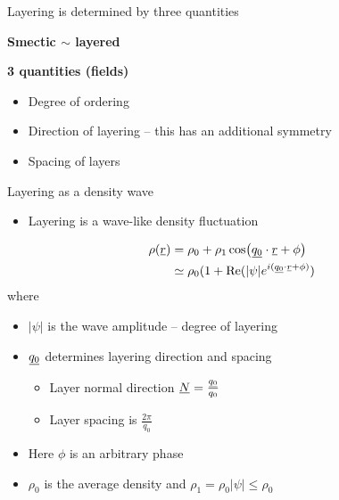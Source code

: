 \documentclass[10pt,mathserif]{beamer}
\newcommand{\suf}[2]{\stackunder[0.5pt]{\stackunder[1pt]{\ensuremath{#1}}{\rule{\widthof{\ensuremath{#2}}*\real{0.9}}{.1ex}}}{}}
\newcommand{\su}[1]{\suf{#1}{#1}}
\newcommand{\ssu}[1]{\scriptsize\su{#1}\normalsize}
\newcommand{\NN}{\ensuremath{\su{N}}}
\newcommand{\extra}[1]{\color{gray} #1 \normalcolor}
\newcommand{\subheading}[1]{\large\textbf{#1}\normalsize}
\begin{document}
\begin{frame}[fragile]{Layering is determined by three quantities}
    \newrefsection
    \vspace{-\fill}
    \vspace{3em}
    \begin{center}
        \subheading{Smectic $\sim$ layered}
        \vspace{3em}

        \subheading{3 quantities \extra{(fields)}}
    \end{center}
    \begin{itemize}
        \item Degree of ordering
        \item Direction of layering \extra{-- this has an additional symmetry}
        \item Spacing of layers
    \end{itemize}
\end{frame}

\begin{frame}[fragile]{Layering as a density wave}
    \newrefsection
    \begin{itemize}
        \item Layering is a wave-like density fluctuation
    \end{itemize}
    \vspace{-1em}
    \begin{align*}
        \rho(\su{r}) &= \rho_0 + \rho_1\cos(\su{q_0}\cdot\su{r} + \phi) \\
        &\simeq \rho_0 (1 + \Re(|\psi| e^{i(\ssu{q_0} \cdot \ssu{r} + \phi)})
    \end{align*}
    where
    \begin{itemize}
        \item $|\psi|$ is the wave amplitude -- degree of layering
        \item $\su{q_0}$ determines layering direction and spacing
        \begin{itemize}
            \item Layer normal direction $\NN=\frac{\ssu{q_0}}{q_0}$
            \item Layer spacing is $\frac{2\pi}{q_0}$
        \end{itemize}
        \item Here $\phi$ is an arbitrary phase
        \extra{\item $\rho_0$ is the average density and $\rho_1=\rho_0|\psi| \leq \rho_0$}
    \end{itemize}
\end{frame}
\end{document}
